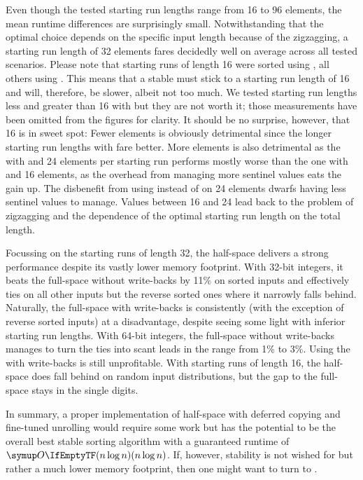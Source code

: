 Even though the tested starting run lengths range from 16 to 96 elements, the mean runtime differences are surprisingly small.
Notwithstanding that the optimal choice depends on the specific input length because of the zigzagging, a starting run length of 32 elements fares decidedly well on average across all tested scenarios.
Please note that starting runs of length 16 were sorted using \IS{}, all others using \ShS{}.
This means that a stable \MS{} must stick to a starting run length of 16 and will, therefore, be slower, albeit not too much.
We tested starting run lengths less and greater than 16 with \IS{} but they are not worth it;
those measurements have been omitted from the figures for clarity.
It should be no surprise, however, that 16 is in sweet spot:
Fewer elements is obviously detrimental since the longer starting run lengths with \ShS{} fare better.
More elements is also detrimental as the \MS{} with \ShS{} and 24 elements per starting run performs mostly worse than the one with \IS{} and 16 elements, as the overhead from managing more sentinel values eats the gain up.
The disbenefit from using \IS{} instead of \ShS{} on 24 elements dwarfs having less sentinel values to manage.
Values between 16 and 24 lead back to the problem of zigzagging and the dependence of the optimal starting run length on the total length.

Focussing on the starting runs of length 32, the half-space \MS{} delivers a strong performance despite its vastly lower memory footprint.
With 32-bit integers, it beats the full-space \MS{} without write-backs by 11\% on sorted inputs and effectively ties on all other inputs but the reverse sorted ones where it narrowly falls behind.
Naturally, the full-space \MS{} with write-backs is consistently (with the exception of reverse sorted inputs) at a disadvantage, despite seeing some light with inferior starting run lengths.
With 64-bit integers, the full-space \MS{} without write-backs manages to turn the ties into scant leads in the range from 1\% to 3\%.
Using the \MS{} with write-backs is still unprofitable.
With starting runs of length 16, the half-space \MS{} does fall behind on random input distributions, but the gap to the full-space \MS{} stays in the single digits.

In summary, a proper implementation of half-space \MS{} with deferred copying and fine-tuned unrolling would require some work but has the potential to be the overall best stable sorting algorithm with a guaranteed runtime of \(\bigoh{n \log n}\).
If, however, stability is not wished for but rather a much lower memory footprint, then one might want to turn to \HS{}.
